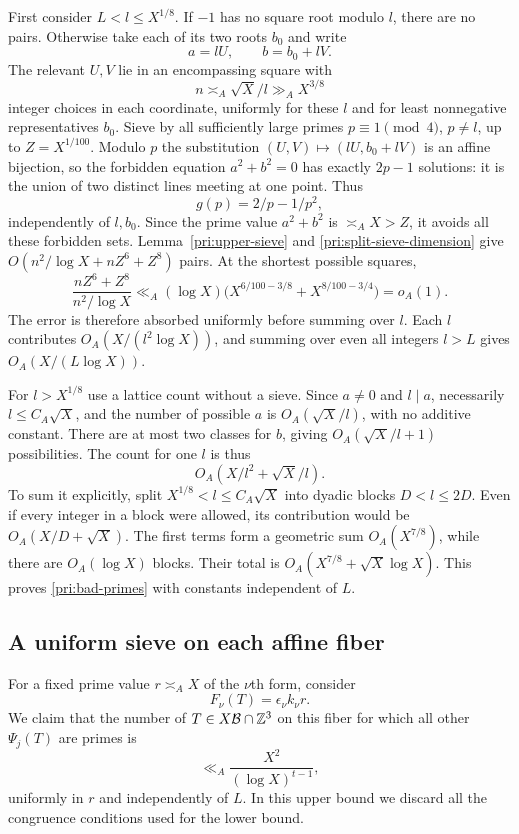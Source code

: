 First consider $L<l\le X^{1/8}$.  If $-1$ has no square root modulo
$l$, there are no pairs.  Otherwise take each of its two roots $b_0$
and write
\[
                          a=lU,\qquad b=b_0+lV.
\]
The relevant $U,V$ lie in an encompassing square with
\begin{equation}\label{pri:short-square}
               n\asymp_A\sqrt X/l\gg_A X^{3/8}
\end{equation}
integer choices in each coordinate, uniformly for these $l$ and for
least nonnegative representatives $b_0$.
Sieve by all sufficiently large primes $p\equiv1\pmod4$, $p\ne l$,
up to $Z=X^{1/100}$.  Modulo $p$ the substitution
$(U,V)\mapsto(lU,b_0+lV)$ is an affine bijection, so the forbidden
equation $a^2+b^2=0$ has exactly $2p-1$ solutions: it is the union of
two distinct lines meeting at one point.  Thus
\[
                            g(p)=2/p-1/p^2,
\]
independently of $l,b_0$.  Since the prime value $a^2+b^2$ is
$\asymp_A X>Z$, it avoids all these forbidden sets.
Lemma~\ref{pri:upper-sieve} and
\eqref{pri:split-sieve-dimension} give
$O(n^2/\log X+nZ^6+Z^8)$ pairs.  At the shortest possible squares,
\[
 \frac{nZ^6+Z^8}{n^2/\log X}
       \ll_A(\log X)
                   \bigl(X^{6/100-3/8}+X^{8/100-3/4}\bigr)=o_A(1).
\]
The error is therefore absorbed uniformly before summing over $l$.
Each $l$ contributes $O_A(X/(l^2\log X))$, and summing over even all
integers $l>L$ gives $O_A(X/(L\log X))$.

For $l>X^{1/8}$ use a lattice count without a sieve.  Since $a\ne0$
and $l\mid a$, necessarily $l\le C_A\sqrt X$, and the number of
possible $a$ is $O_A(\sqrt X/l)$, with no additive constant.
There are at most two classes for $b$, giving
$O_A(\sqrt X/l+1)$ possibilities.  The count for one $l$ is thus
\[
                         O_A(X/l^2+\sqrt X/l).
\]
To sum it explicitly, split $X^{1/8}<l\le C_A\sqrt X$ into dyadic
blocks $D<l\le2D$.  Even if every integer in a block were allowed, its
contribution would be $O_A(X/D+\sqrt X)$.  The first terms form a
geometric sum $O_A(X^{7/8})$, while there are $O_A(\log X)$ blocks.
Their total is $O_A(X^{7/8}+\sqrt X\log X)$.  This proves
\eqref{pri:bad-primes} with constants independent of $L$.

\subsection{A uniform sieve on each affine fiber}

For a fixed prime value $r\asymp_A X$ of the $\nu$th form, consider
\begin{equation}\label{pri:fiber}
                         F_\nu(T)=\epsilon_\nu k_\nu r.
\end{equation}
We claim that the number of $T\in X\mathcal B\cap\mathbb Z^3$ on this
fiber for which all other $\Psi_j(T)$ are primes is
\begin{equation}\label{pri:fiber-bound}
                              \ll_A\frac{X^2}{(\log X)^{t-1}},
\end{equation}
uniformly in $r$ and independently of $L$.  In this upper bound we
discard all the congruence conditions used for the lower bound.


